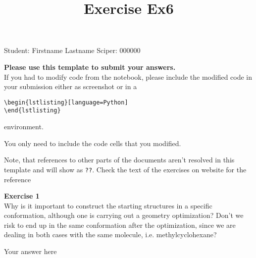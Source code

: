 \documentclass{article}
\title{Exercise Ex6}
\begin{document}
\maketitle\maketitle
\begin{center}\logo\end{center}


Student:  Firstname Lastname    Sciper: 000000

\begin{mdframed}
\textbf{Please use this template to submit your answers.}\\
If you had to modify code from the notebook, please include the modified code in your submission either as screenshot or in a

\begin{verbatim}
\begin{lstlisting}[language=Python]
\end{lstlisting}
\end{verbatim}

environment.

You only need to include the code cells that you modified.

Note, that references to other parts of the documents aren't resolved in this template and will show as \texttt{??}. Check the text of the exercises on website for the reference
\end{mdframed}

\begin{mdframed}
\textbf{Exercise 1}\\
Why is it important to construct the starting structures in a specific conformation, although one is carrying out a geometry optimization? Don't we risk to end up in the same conformation after the optimization, since we are dealing in both cases with the same molecule, i.e. methylcyclohexane?
\end{mdframed}

Your answer here
\end{document}

